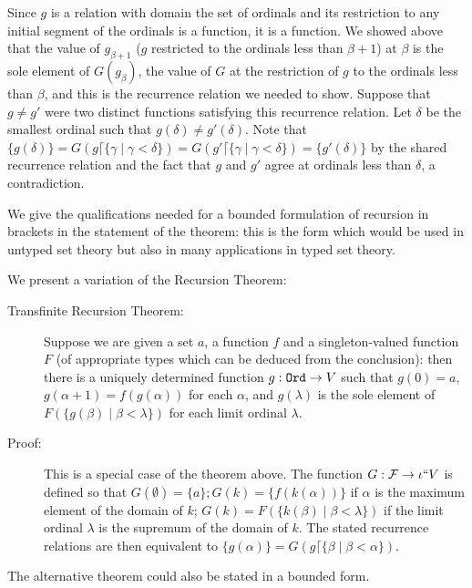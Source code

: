 \documentclass[12pt]{book}
\begin{document}
\begin{description}
Since $g$ is a relation with domain the set of ordinals and its
restriction to any initial segment of the ordinals is a function, it
is a function.  We showed above that the value of $g_{\beta+1}$ ($g$
restricted to the ordinals less than $\beta+1$) at $\beta$ is the sole
element of $G(g_\beta)$, the value of $G$ at the restriction of $g$ to
the ordinals less than $\beta$, and this is the recurrence relation we
needed to show.  Suppose that $g \neq g'$ were two distinct functions
satisfying this recurrence relation.  Let $\delta$ be the smallest
ordinal such that $g(\delta) \neq g'(\delta)$.  Note that $\{g(\delta)\} =
G(g\lceil \{\gamma\mid\gamma<\delta\}) = G(g'\lceil
\{\gamma\mid\gamma<\delta\}) = \{g'(\delta)\}$ by the shared recurrence
relation and the fact that $g$ and $g'$ agree at ordinals less than
$\delta$, a contradiction.

\end{description}

We give the qualifications needed for a bounded formulation of
recursion in brackets in the statement of the theorem: this is the
form which would be used in untyped set theory but also in many
applications in typed set theory.

We present a variation of the Recursion Theorem:

\begin{description}

\item[Transfinite Recursion Theorem:] Suppose we are given a set $a$,
a function $f$ and a singleton-valued function $F$ (of appropriate
types which can be deduced from the conclusion): then there is a
uniquely determined function $g:{\tt Ord}\rightarrow V$ such that
$g(0) = a$, $g(\alpha+1) = f(g(\alpha))$ for each $\alpha$, and
$g(\lambda)$ is the sole element of $F(\{g(\beta)\mid
\beta<\lambda\})$ for each limit ordinal $\lambda$.

\item[Proof:] This is a special case of the theorem above.  The
function $G:{\cal F}\rightarrow \iota``V$ is defined so that
$G(\emptyset)=\{a\}; G(k) = \{f(k(\alpha))\}$ if $\alpha$ is the
maximum element of the domain of $k$; $G(k) = F(\{k(\beta) \mid
\beta<\lambda\})$ if the limit ordinal $\lambda$ is the supremum of
the domain of $k$.  The stated recurrence relations are then
equivalent to $\{g(\alpha)\} = G(g \lceil \{\beta\mid\beta<\alpha\})$.

\end{description}

The alternative theorem could also be stated in a bounded form.
\end{document}
